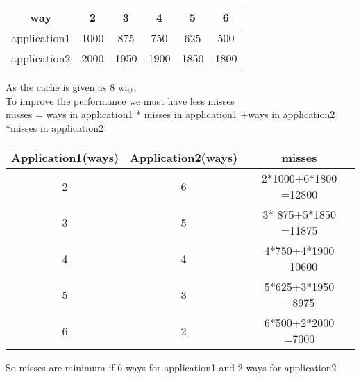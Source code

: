 \documentclass[12pt]{article}
\begin{document}
\begin{center}
	\begin{tabular}{ |c|c|c|c|c|c| } 
		\hline
		way & 2 & 3 & 4 & 5 & 6 \\ 
		\hline
		application1  & 1000 & 875 &750 &625 & 500 \\ 
		application2 & 2000 & 1950 & 1900 & 1850 & 1800 \\ 
		\hline
	\end{tabular}
\end{center}
As the cache is given as 8 way,\\
To improve the performance we must have less misses \\
misses =  ways in application1 * misses in application1 +ways in application2 *misses in application2 


\begin{center}
	\begin{tabular}{ |c|c|c| } 
		\hline
		Application1(ways) & Application2(ways) & misses \\ 
		\hline
		2 & 6 & 2*1000+6*1800 =12800\\ 
		3 & 5 & 3* 875+5*1850 =11875\\ 
		4 & 4 & 4*750+4*1900 =10600\\
		5 & 3 & 5*625+3*1950 =8975\\
		6 & 2 & 6*500+2*2000 =7000 \\
		\hline
	\end{tabular}
\end{center}
So misses are minimum if 6 ways for application1 and 2 ways for application2\\
\end{document}
